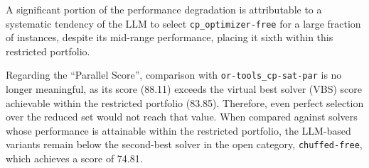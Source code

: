 \documentclass[../../main]{subfiles}
\begin{document}
A significant portion of the performance degradation is attributable to a systematic tendency of the LLM to select \texttt{cp\_optimizer-free} for a large fraction of instances, despite its mid-range performance, placing it sixth within this restricted portfolio.

Regarding the ``Parallel Score'', comparison with \texttt{or-tools\_cp-sat-par} is no longer meaningful, as its score (88.11) exceeds the virtual best solver (VBS) score achievable within the restricted portfolio (83.85). Therefore, even perfect selection over the reduced set would not reach that value. When compared against solvers whose performance is attainable within the restricted portfolio, the LLM-based variants remain below the second-best solver in the open category, \texttt{chuffed-free}, which achieves a score of 74.81.
\end{document}
